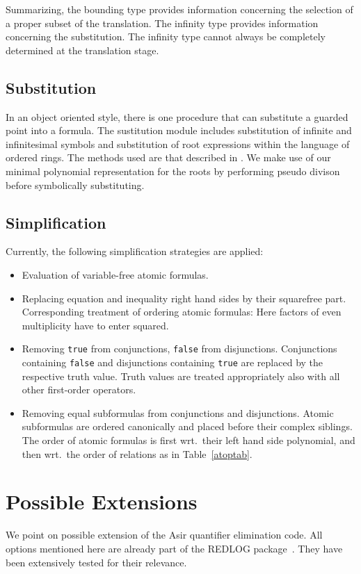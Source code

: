 Summarizing, the bounding type provides information concerning the
selection of a proper subset of the translation. The infinity type
provides information concerning the substitution. The infinity type
cannot always be completely determined at the translation stage.
%
\subsection{Substitution}
In an object oriented style, there is one procedure that can
substitute a guarded point into a formula. The sustitution module
includes substitution of infinite and infinitesimal symbols and
substitution of root expressions within the language of ordered rings. 
The methods used are that described in \cite{Weispfenning:96}. We make
use of our minimal polynomial representation for the roots by
performing pseudo divison before symbolically substituting.
%
\subsection{Simplification}\label{currentsimpl}
Currently, the following simplification strategies are applied:
\begin{itemize}
\item
Evaluation of variable-free atomic formulas.
\item
Replacing equation and inequality right hand sides by their squarefree
part. Corresponding treatment of ordering atomic formulas: Here
factors of even multiplicity have to enter squared.
\item
Removing \verb!true! from conjunctions, \verb!false! from
disjunctions. Conjunctions containing \verb!false! and disjunctions
containing \verb!true! are replaced by the respective truth value.
Truth values are treated appropriately also with all other first-order
operators. 
\item
Removing equal subformulas from conjunctions and disjunctions. Atomic
subformulas are ordered canonically and placed before their complex
siblings. The order of atomic formulas is first wrt.~their left hand
side polynomial, and then wrt.~the order of relations as in
Table~\ref{atoptab}.
\end{itemize}
%
\section{Possible Extensions}\label{genopt}
We point on possible extension of the Asir quantifier elimination
code. All options mentioned here are already part of the REDLOG
package~\cite{DolzmannSturm:95a,DolzmannSturm:96}. They have been
extensively tested for their relevance.
